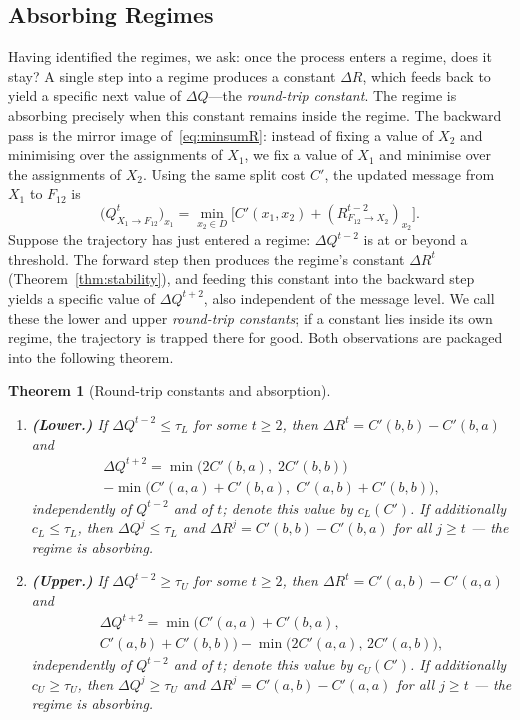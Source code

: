 \documentclass[letterpaper]{article} %
\newtheorem{theorem}{Theorem}[section]
\theoremstyle{definition}
\theoremstyle{remark}
\begin{document}
\subsection{Absorbing Regimes}\label{sec:absorbing}
Having identified the regimes, we ask: once the process enters a regime, does it stay? A single step into a regime produces a constant $\Delta R$, which feeds back to yield a specific next value of $\Delta Q$—the \emph{round-trip constant}. The regime is absorbing precisely when this constant remains inside the regime.
The backward pass is the mirror image of~\eqref{eq:minsumR}: instead of fixing a value of $X_2$ and minimising over the assignments of $X_1$, we fix a value of $X_1$ and minimise over the assignments of $X_2$.  Using the same split cost $C'$, the updated message from $X_1$ to $F_{12}$ is
\begin{equation}\label{eq:minsumQ}
    \bigl(Q^t_{X_1 \to F_{12}}\bigr)_{x_1} = \min_{x_2 \in D}\bigl[C'(x_1, x_2) + (R^{t-2}_{F_{12} \to X_2})_{x_2}\bigr].
\end{equation}
Suppose the trajectory has just entered a regime: $\Delta Q^{t-2}$ is at or beyond a threshold.  The forward step then produces the regime's constant $\Delta R^t$ (Theorem~\ref{thm:stability}), and feeding this constant into the backward step yields a specific value of $\Delta Q^{t+2}$, also independent of the message level.  We call these the lower and upper \emph{round-trip constants}; if a constant lies inside its own regime, the trajectory is trapped there for good.  Both observations are packaged into the following theorem.
\begin{theorem}[Round-trip constants and absorption]\label{thm:absorbing}
\begin{enumerate}
\item \textbf{(Lower.)}  If $\Delta Q^{t-2} \leq \tau_L$ for some $t \geq 2$, then $\Delta R^t = C'(b,b) - C'(b,a)$ and
\begin{multline}\label{eq:cL}
    \Delta Q^{t+2}
    = \min\!\bigl(2C'(b,a),\;2C'(b,b)\bigr) \\
    - \min\!\bigl(C'(a,a)+C'(b,a),\;C'(a,b)+C'(b,b)\bigr),
\end{multline}
independently of $Q^{t-2}$ and of $t$; denote this value by $c_L(C')$.  If additionally $c_L \leq \tau_L$, then $\Delta Q^j \leq \tau_L$ and $\Delta R^j = C'(b,b) - C'(b,a)$ for all $j \geq t$ --- the regime is \emph{absorbing}.
\item \textbf{(Upper.)}  If $\Delta Q^{t-2} \geq \tau_U$ for some $t \geq 2$, then $\Delta R^t = C'(a,b) - C'(a,a)$ and
\begin{multline}\label{eq:cU}
    \Delta Q^{t+2}
    = \min\!\bigl(C'(a,a)+C'(b,a), \\
    C'(a,b)+C'(b,b)\bigr)
    - \min\!\bigl(2C'(a,a),\,2C'(a,b)\bigr),
\end{multline}
independently of $Q^{t-2}$ and of $t$; denote this value by $c_U(C')$.  If additionally $c_U \geq \tau_U$, then $\Delta Q^j \geq \tau_U$ and $\Delta R^j = C'(a,b) - C'(a,a)$ for all $j \geq t$ --- the regime is \emph{absorbing}.
\end{enumerate}
\end{theorem}
\end{document}
